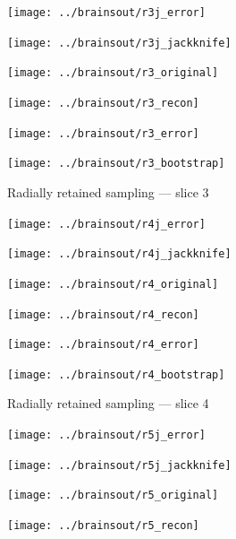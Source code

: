 \documentclass[article]{jdssv}
\begin{document}
\begin{appendix}
\begin{figure}
\begin{centering}

\parbox{\imsize}{\texttt{[image: ../brainsout/r3j\_error]}}
\parbox{\imsize}{\texttt{[image: ../brainsout/r3j\_jackknife]}}

\vspace{\vertsep}

\parbox{\imsize}{\texttt{[image: ../brainsout/r3\_original]}}
\parbox{\imsize}{\texttt{[image: ../brainsout/r3\_recon]}}

\vspace{\vertsep}

\parbox{\imsize}{\texttt{[image: ../brainsout/r3\_error]}}
\parbox{\imsize}{\texttt{[image: ../brainsout/r3\_bootstrap]}}

\end{centering}
\caption{Radially retained sampling --- slice 3}
\end{figure}


\begin{figure}
\begin{centering}

\parbox{\imsize}{\texttt{[image: ../brainsout/r4j\_error]}}
\parbox{\imsize}{\texttt{[image: ../brainsout/r4j\_jackknife]}}

\vspace{\vertsep}

\parbox{\imsize}{\texttt{[image: ../brainsout/r4\_original]}}
\parbox{\imsize}{\texttt{[image: ../brainsout/r4\_recon]}}

\vspace{\vertsep}

\parbox{\imsize}{\texttt{[image: ../brainsout/r4\_error]}}
\parbox{\imsize}{\texttt{[image: ../brainsout/r4\_bootstrap]}}

\end{centering}
\caption{Radially retained sampling --- slice 4}
\end{figure}


\begin{figure}
\begin{centering}

\parbox{\imsize}{\texttt{[image: ../brainsout/r5j\_error]}}
\parbox{\imsize}{\texttt{[image: ../brainsout/r5j\_jackknife]}}

\vspace{\vertsep}

\parbox{\imsize}{\texttt{[image: ../brainsout/r5\_original]}}
\parbox{\imsize}{\texttt{[image: ../brainsout/r5\_recon]}}


\end{centering}
\end{figure}
\end{appendix}
\end{document}
